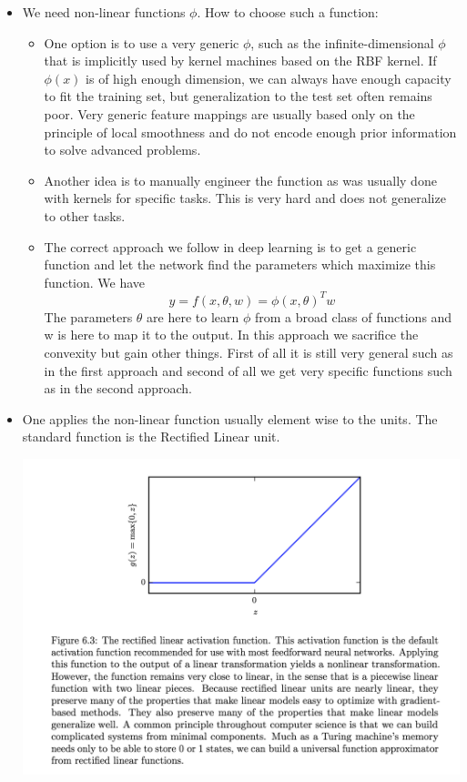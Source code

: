 \documentclass[a4paper]{article}
\begin{document}
\begin{itemize}
\item We need non-linear functions $\phi$. How to choose such a function: 
	\begin{itemize}
	\item One option is to use a very generic $\phi$, such as the infinite-dimensional $\phi$ that is implicitly used by kernel machines based on the RBF kernel. If $\phi(x)$ is of high enough dimension, we can always have enough capacity to fit the training set, but generalization to the test set often remains poor. Very generic feature mappings are usually based only on the principle of local smoothness and do not encode enough prior information to solve advanced problems. 
    \item Another idea is to manually engineer the function as was usually done with kernels for specific tasks. This is very hard and does not generalize to other tasks. 
    \item The correct approach we follow in deep learning is  to get a generic function and let the network find the parameters which maximize this function. We have $$y = f(x,\theta,w) = \phi(x,\theta)^T w$$ The parameters $\theta$ are here to learn $\phi$ from a broad class of functions and w is here to map it to the output. In this approach we sacrifice the convexity but gain other things. First of all it is still very general such as in the first approach and second of all we get very specific functions such as in the second approach. 
	\end{itemize}
\item One applies the non-linear function usually element wise to the units. The standard function is the Rectified Linear unit. 
\begin{center}
\includegraphics[width=\textwidth]{image/relu.png}
\end{center}
\end{itemize}
\end{document}
